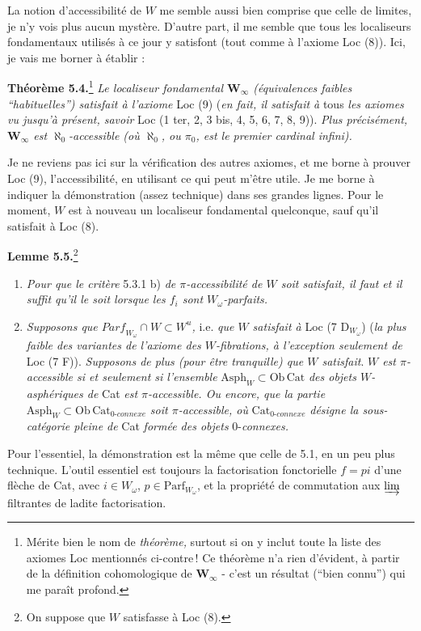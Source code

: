 \documentclass[11pt]{article}
\newcommand{\printedpage}[1]{\marginpar{\footnotesize p.~#1}}
\newcommand{\msp}[1]{\marginpar{\footnotesize [#1]}}
\newcommand{\Parf}{\mathrm{Parf}}
\begin{document}
La notion d'accessibilité de $W$ me semble aussi bien comprise que celle de limites, je n'y vois plus aucun mystère. D'autre part, il me semble que tous les localiseurs fondamentaux utilisés à ce jour y satisfont (tout comme à l'axiome Loc (8)). Ici, je vais me borner à établir :

\printedpage{43}

\textbf{Théorème 5.4.}\footnote[39]{Mérite bien le nom de \textit{théorème,} surtout si on y inclut toute la liste des axiomes Loc mentionnés ci-contre\,! Ce théorème n'a rien d'évident, à partir de la définition cohomologique de $\mathbf{W}_\infty$ - c'est un résultat (``bien connu'') qui me paraît profond.} \textit{Le localiseur fondamental $\mathbf{W}_\infty$ (équivalences faibles ``habituelles'') satisfait à l'axiome} Loc (9) (\textit{en fait, il satisfait à} tous \textit{les axiomes vu jusqu'à présent, savoir} Loc (1 ter, 2, 3 bis, 4, 5, 6, 7, 8, 9)). \textit{Plus précisément, $\mathbf{W}_\infty$ est $\aleph_0$-accessible (où $\aleph_0$, ou $\pi_0$, est le premier cardinal infini).} %

Je ne reviens pas ici sur la vérification des autres axiomes, et me borne à prouver Loc (9), l'accessibilité, en utilisant ce qui peut m'être utile. Je me
\msp{page 80}
borne à indiquer la démonstration (assez technique) dans ses grandes lignes. Pour le moment, $W$ est à nouveau un localiseur fondamental quelconque, sauf qu'il satisfait à Loc (8).

\textbf{Lemme 5.5.}\footnote[40]{On suppose que $W$ satisfasse à Loc (8).}
\begin{enumerate}[label={}]
\item[a)] \textit{Pour que le critère} 5.3.1 b) \textit{de $\pi$-accessibilité de $W$ soit satisfait, il faut et il suffit qu'il le soit lorsque les $f_i$ sont $W_\omega$-parfaits.}
\item[b)] \textit{Supposons que $\mathit{Parf}_{W_\omega} \cap W \subset W^u$,} i.e. \textit{que $W$ satisfait à} Loc (7 $\mathrm{D}_{W_\omega}$) (\textit{la plus faible des variantes de l'axiome des $W$-fibrations, à l'exception seulement de} Loc (7 F)). \textit{Supposons de plus (pour être tranquille) que $W$ satisfait}. \textit{$W$ est $\pi$-accessible si et seulement si l'ensemble} $\mathrm{Asph}_W \subset \mathrm{Ob}\,\mathrm{Cat}$ \textit{des objets $W$-asphériques de} Cat \textit{est $\pi$-accessible. Ou encore, que la partie} $\mathrm{Asph}_W \subset \mathrm{Ob}\,\mathrm{Cat}_{\textit{0-connexe}}$ \textit{soit $\pi$-accessible, où} $\mathrm{Cat}_{\textit{0-connexe}}$ \textit{désigne la sous-catégorie pleine de} Cat \textit{formée des objets} 0-\textit{connexes.}
\end{enumerate}
Pour l'essentiel, la démonstration est la même que celle de 5.1, en un peu plus technique. L'outil essentiel est toujours la factorisation fonctorielle $f = pi$ d'une flèche de Cat, avec $i \in W_\omega$, $p \in \Parf_{W_\omega}$, et la propriété de
\msp{page 81}
commutation aux $\varinjlim$ filtrantes de ladite factorisation.
\end{document}

